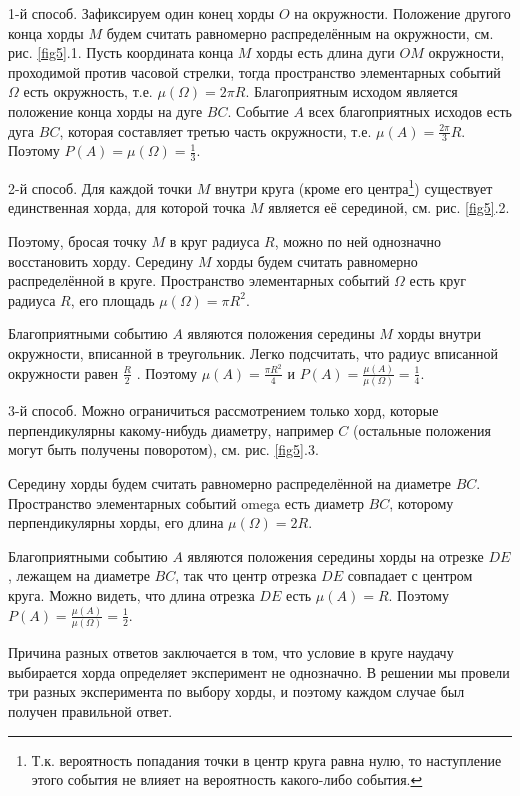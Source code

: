 \begin{example}
1-й способ. Зафиксируем один конец хорды $O$ на окружности. Положение другого конца хорды $M$ будем считать равномерно распределённым на окружности, см. рис. \ref{fig5}.1. Пусть координата конца $M$ хорды есть длина дуги $OM$ окружности, проходимой против часовой стрелки, тогда пространство элементарных событий $\Omega$ есть окружность, т.е. $\mu(\Omega) = 2 \pi R$. Благоприятным
исходом является положение конца хорды на дуге $BC$. Событие $A$ всех благоприятных исходов есть дуга $BC$, которая составляет третью часть окружности, т.е. $\mu(A) = \frac{2 \pi}{3} R$. Поэтому $P(A) = \mu(\Omega) = \frac{1}{3}$.

2-й способ. Для каждой точки $M$ внутри круга (кроме его центра\footnote{
Т.к. вероятность попадания точки в центр круга равна нулю, то наступление этого события не влияет
на вероятность какого-либо события.
}) 
существует единственная хорда, для которой точка $M$ является её серединой, см. рис. \ref{fig5}.2. 

Поэтому, бросая точку $M$ в круг радиуса $R$, можно по ней однозначно восстановить хорду. Середину $M$ хорды будем считать равномерно распределённой в круге. Пространство элементарных событий $\Omega$ есть круг
радиуса $R$, его площадь $\mu(\Omega) = \pi R^2$. 

Благоприятными событию $A$ являются положения середины $M$ хорды внутри окружности, вписанной в треугольник. Легко подсчитать, что радиус вписанной окружности равен $\frac{R}{2}$ . Поэтому $\mu(A) = \frac{\pi R^2}{4}$ и $P(A) = \frac{\mu(A)}{\mu(\Omega)} = \frac{1}{4}$.

3-й способ. Можно ограничиться рассмотрением только хорд, которые перпендикулярны какому-нибудь диаметру, например $C$ (остальные положения могут быть получены поворотом), см. рис. \ref{fig5}.3. 

Середину хорды будем считать равномерно распределённой на диаметре $BC$. Пространство элементарных событий omega есть диаметр $BC$, которому перпендикулярны хорды, его длина $\mu(\Omega) = 2R$. 

Благоприятными событию $A$ являются положения середины хорды на отрезке $DE$, лежащем на диаметре $BC$, так что центр отрезка $DE$ совпадает с центром круга. Можно видеть, что длина отрезка $DE$ есть $\mu(A) = R$. Поэтому $P(A) = \frac{\mu(A)}{\mu(\Omega)} = \frac{1}{2}$.

Причина разных ответов заключается в том, что условие в круге наудачу выбирается хорда определяет эксперимент не однозначно. В решении мы провели три разных эксперимента по выбору хорды, и поэтому каждом случае был получен правильной ответ.

\end{example}

% 